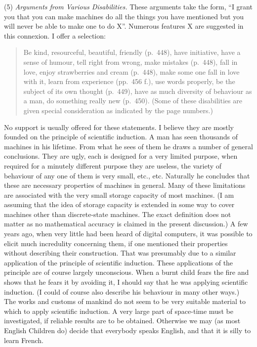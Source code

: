 \documentclass[10pt]{article} %
\begin{document}
\noindent\normalfont (5) \textit{Arguments from Various Disabilities.} These arguments take the form, ``I grant you that you can make machines do all the things you have mentioned but you will never be able to make one to do X''. Numerous features X are suggested in this connexion. I offer a selection:

\begin{quote} %
Be kind, resourceful, beautiful, friendly (p.~448), have initiative, have a sense of humour, tell right from wrong, make mistakes (p.~448), fall in love, enjoy strawberries and cream (p.~448), make some one fall in love with it, learn from experience (pp.~456 f.), use words properly, be the subject of its own thought (p.~449), have as much diversity of behaviour as a man, do something really new (p.~450). (Some of these disabilities are given special consideration as indicated by the page numbers.)
\end{quote}

No support is usually offered for these statements. I believe they are mostly founded on the principle of scientific induction. A man has seen thousands of machines in his lifetime. From what he sees of them he draws a number of general conclusions. They are ugly, each is designed for a very limited purpose, when required for a minutely different purpose they are useless, the variety of behaviour of any one of them is very small, etc., etc. Naturally he concludes that these are necessary properties of machines in general. Many of these limitations are associated with the very small storage capacity of most machines. (I am assuming that the idea of storage capacity is extended in some way to cover machines other than discrete-state machines. The exact definition does not matter as no mathematical accuracy is claimed in the present discussion.) A few years ago, when very little had been heard of digital computers, it was possible to elicit much incredulity concerning them, if one mentioned their properties without describing their construction. That was presumably due to a similar application of the principle of scientific induction. These applications of the principle are of course largely unconscious. When a burnt child fears the fire and shows that he fears it by avoiding it, I should say that he was applying scientific induction. (I could of course also describe his behaviour in many other ways.) The works and customs of mankind do not seem to be very suitable material to which to apply scientific induction. A very large part of space-time must be investigated, if reliable results are to be obtained. Otherwise we may (as most English Children do) decide that everybody speaks English, and that it is silly to learn French.
\end{document}
